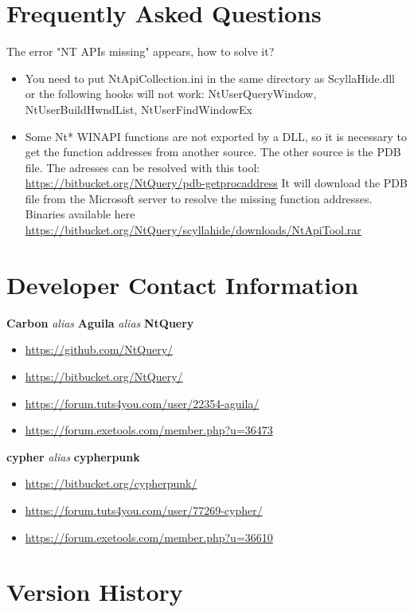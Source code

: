 \documentclass[10pt,a4paper]{article}
\begin{document}
\section{Frequently Asked Questions}
The error "NT APIs missing" appears, how to solve it?
\begin{itemize}
\item You need to put NtApiCollection.ini in the same directory as ScyllaHide.dll or the following hooks will not work: NtUserQueryWindow, NtUserBuildHwndList, NtUserFindWindowEx
\item Some Nt* WINAPI functions are not exported by a DLL, so it is necessary to get the function addresses from another source. The other source is the PDB file. The adresses can be resolved with this tool: \url{https://bitbucket.org/NtQuery/pdb-getprocaddress} It will download the PDB file from the Microsoft server to resolve the missing function addresses. Binaries available here \url{https://bitbucket.org/NtQuery/scyllahide/downloads/NtApiTool.rar}
\end{itemize}

\section{Developer Contact Information}

\begin{center}
\textbf{Carbon} \textit{alias} \textbf{Aguila} \textit{alias} \textbf{NtQuery}
\begin{itemize}
\item \url{https://github.com/NtQuery/}
\item \url{https://bitbucket.org/NtQuery/}
\item \url{https://forum.tuts4you.com/user/22354-aguila/}
\item \url{https://forum.exetools.com/member.php?u=36473}
\end{itemize}


\textbf{cypher} \textit{alias} \textbf{cypherpunk}
\begin{itemize}
\item \url{https://bitbucket.org/cypherpunk/}
\item \url{https://forum.tuts4you.com/user/77269-cypher/}
\item \url{https://forum.exetools.com/member.php?u=36610}
\end{itemize}
\end{center}

\section{Version History}
\end{document}

